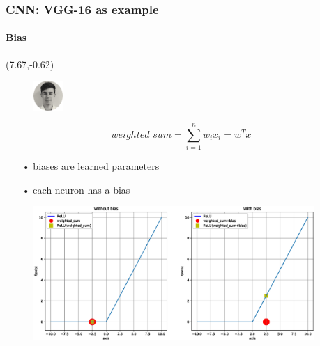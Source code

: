 \begin{frame}
\frametitle{CNN: VGG-16 as example}
\framesubtitle{Bias} 

\begin{textblock}{15}(7.67,-0.62)
	\begin{figure}[H]
		\includegraphics[width=0.1\textwidth]{Images/Team/DamienTOOMEY.png} 
	\end{figure}
\end{textblock}

\[ weighted\_sum = \sum_{i=1}^n w_i x_i = w^T x \]

\begin{itemize}
\item[•] biases are learned parameters
\item[•] each neuron has a bias
\end{itemize}

\begin{figure}[H]
	\includegraphics[width=0.95\textwidth]{Images/Plot/ReLU_bias.eps} 
\end{figure}
\end{frame}